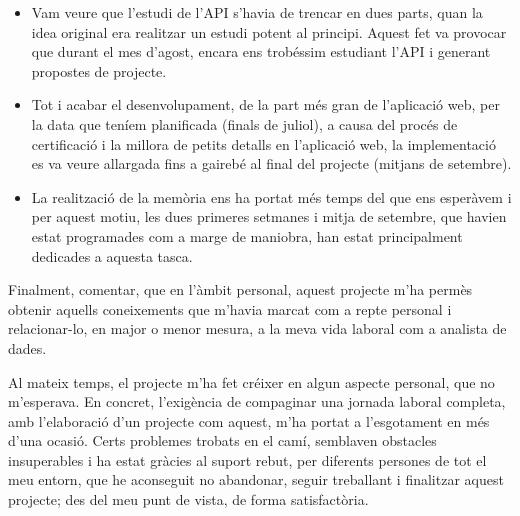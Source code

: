     \begin{itemize}
        \item Vam veure que l'estudi de l'API s'havia de trencar en dues parts, quan la idea original era realitzar un estudi potent al principi. Aquest fet va provocar que durant el mes d'agost, encara ens trobéssim estudiant l'API i generant propostes de projecte.
        \item Tot i acabar el desenvolupament, de la part més gran de l'aplicació web, per la data que teníem planificada (finals de juliol), a causa del procés de certificació i la millora de petits detalls en l'aplicació web, la implementació es va veure allargada fins a gairebé al final del projecte (mitjans de setembre).
        \item La realització de la memòria ens ha portat més temps del que ens esperàvem i per aquest motiu, les dues primeres setmanes i mitja de setembre, que havien estat programades com a marge de maniobra, han estat principalment dedicades a aquesta tasca.
    \end{itemize}

    Finalment, comentar, que en l’àmbit personal, aquest projecte m’ha permès obtenir aquells coneixements que m’havia marcat com a repte personal i relacionar-lo, en major o menor mesura, a la meva vida laboral com a analista de dades.

    Al mateix temps, el projecte m’ha fet créixer en algun aspecte personal, que no m’esperava. En concret, l’exigència de compaginar una jornada laboral completa, amb l’elaboració d’un projecte com aquest, m’ha portat a l’esgotament en més d’una ocasió. Certs problemes trobats en el camí, semblaven obstacles insuperables i ha estat gràcies al suport rebut, per diferents persones de tot el meu entorn, que he aconseguit no abandonar, seguir treballant i finalitzar aquest projecte; des del meu punt de vista, de forma satisfactòria.
